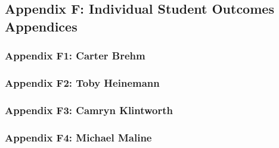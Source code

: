\documentclass[12pt]{article}
\begin{document}
\subsection{Appendix F: Individual Student Outcomes Appendices}
\subsubsection{Appendix F1: Carter Brehm}
\subsubsection{Appendix F2: Toby Heinemann}
\subsubsection{Appendix F3: Camryn Klintworth}
\subsubsection{Appendix F4: Michael Maline}
\end{document}
